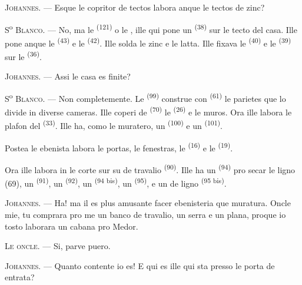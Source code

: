 \textsc{Johannes}. --- Esque le copritor de tectos labora anque le tectos de
zinc?

S\textsuperscript{o} \textsc{Blanco}. --- No, ma le 
\textsuperscript{(121)} o le , ille qui pone un
 \textsuperscript{(38)} sur le tecto del casa. Ille pone anque
le  \textsuperscript{(43)} e le  \textsuperscript{(42)}. Ille solda le zinc e le latta. Ille fixava le
 \textsuperscript{(40)} e le 
\textsuperscript{(39)} sur le  \textsuperscript{(36)}.

\textsc{Johannes}. --- Assi le casa es finite?

\VUsaut{3.0mm}
\VUsaut{3.0mm}

S\textsuperscript{o} \textsc{Blanco}. --- Non completemente. Le
 \textsuperscript{(99)} construe con 
\textsuperscript{(61)} le parietes que lo divide in diverse cameras. Ille coperi
de  \textsuperscript{(70)} le 
\textsuperscript{(26)} e le muros. Ora ille labora le plafon del
 \textsuperscript{(33)}. Ille ha, como le muratero, un
 \textsuperscript{(100)} e un 
\textsuperscript{(101)}.

Postea le ebenista labora le portas, le fenestras, le 
\textsuperscript{(16)} e le  \textsuperscript{(19)}.

Ora ille labora in le corte sur su  de travalio
\textsuperscript{(90)}. Ille ha un  \textsuperscript{(94)} pro
secar le ligno (69), un  \textsuperscript{(91)}, un
 \textsuperscript{(92)}, un 
\textsuperscript{(94 bis)}, un  \textsuperscript{(95)}, e un
 de ligno \textsuperscript{(95 bis)}.

\textsc{Johannes}. --- Ha! ma il es plus amusante facer ebenisteria que
muratura. Oncle mie, tu comprara pro me un banco de travalio, un serra e un
plana, proque io tosto laborara un cabana pro Medor.

\textsc{Le oncle}. --- Si, parve puero.

\textsc{Johannes}. --- Quanto contente io es! E qui es ille qui sta presso le
porta de entrata?

